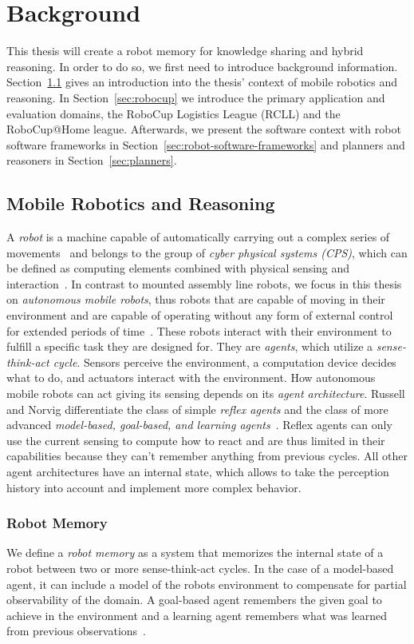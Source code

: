 \chapter{Background}
\label{chap:background}
This thesis will create a robot memory for knowledge sharing and
hybrid reasoning. In order to do so, we first need to introduce
background information. Section~\ref{sec:mobile-robotics} gives an
introduction into the thesis' context of mobile robotics and
reasoning. In Section~\ref{sec:robocup} we introduce the primary
application and evaluation domains, the RoboCup Logistics League
(RCLL) and the RoboCup@Home league. Afterwards, we present the
software context with robot software frameworks in
Section~\ref{sec:robot-software-frameworks} and planners and reasoners in
Section~\ref{sec:planners}.

\section{Mobile Robotics and Reasoning}
\label{sec:mobile-robotics}
A \emph{robot} is a machine capable of automatically carrying out a
  complex series of movements~\cite{robot-dict} and belongs to the
group of \emph{cyber physical systems (CPS)}, which can be defined
as computing elements combined with physical sensing and
  interaction~\cite{chapter-cps}. In contrast to mounted assembly
line robots, we focus in this thesis on \emph{autonomous mobile robots}, thus
robots that are capable of moving in their environment and
are capable of operating without any form of external control
  for extended periods of time~\cite{autonomous-robots}. These robots
interact with their environment to fulfill a specific task they are
designed for. They are \emph{agents}, which utilize a
\emph{sense-think-act cycle}. Sensors perceive the
environment, a computation device decides what to do, and actuators
interact with the environment. How autonomous mobile robots can
act giving its sensing depends on its \emph{agent
  architecture}. Russell and Norvig differentiate the class of simple
\emph{reflex agents} and the class of more advanced
\emph{model-based, goal-based, and learning
  agents}~\cite{aimodern}. Reflex agents can only use the current
sensing to compute how to react and are thus limited in their
capabilities because they can't remember anything from previous
cycles. All other agent architectures have an internal state, which
allows to take the perception history into account and implement more
complex behavior.

\subsection{Robot Memory}
\label{sec:robot-memories}
We define a \emph{robot memory} as a system that memorizes the
internal state of a robot between two or more sense-think-act
cycles. In the case of a model-based agent, it can include a model of
the robots environment to compensate for partial observability of the
domain. A goal-based agent remembers the given goal to achieve in the
environment and a learning agent remembers what was learned from
previous observations~\cite{aimodern}.

